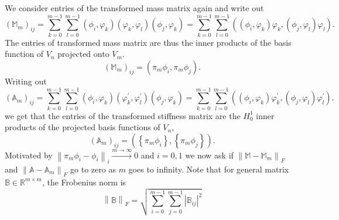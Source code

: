 \documentclass[a4paper,10pt]{article}
\newcommand{\R}{\ensuremath{\mathbb{R}}}
\newcommand{\norm}[1]{\ensuremath{\left\|#1\right\|}}
\newcommand{\inner}[2]{\ensuremath{\left(#1, #2\right)}}
\newcommand{\Amat}{\ensuremath{\mathbb{A}}}
\newcommand{\Bmat}{\ensuremath{\mathbb{B}}}
\newcommand{\Mmat}{\ensuremath{\mathbb{M}}}
\newcommand{\Ammat}{\ensuremath{\mathbb{A}_m}}               %
\newcommand{\Mmmat}{\ensuremath{\mathbb{M}_m}}               %
\begin{document}
  We consider entries of the transformed mass matrix again and write out
  \[
    \left(\Mmmat\right)_{ij} =
    \displaystyle\sum\limits_{k=0}^{m-1}
    \displaystyle\sum\limits_{l=0}^{m-1}
    \inner{\phi_i}{\varphi_k}\inner{\varphi_k}{\varphi_l}\inner{\phi_j}{\varphi_k}=
    \displaystyle\sum\limits_{k=0}^{m-1}
    \displaystyle\sum\limits_{l=0}^{m-1}
    \inner{\inner{\phi_i}{\varphi_k}\varphi_k}
          {\inner{\phi_j}{\varphi_l}\varphi_l}.
  \]
  The entries of transformed mass matrix are thus the inner products of the
  basis function of $V_n$ projected onto $V_m$.
  \[
    \left(\Mmmat\right)_{ij} = \inner{\pi_m\phi_i}
                                     {\pi_m\phi_j}.
  \]
  Writing out
  \[
    \left(\Ammat\right)_{ij} =
    \displaystyle\sum\limits_{k=0}^{m-1}
    \displaystyle\sum\limits_{l=0}^{m-1}
    \inner{\phi_i}{\varphi_k}
    \inner{\varphi_k^{\prime}}{\varphi_l^{\prime}}
    \inner{\phi_j}{\varphi_k}=
    \displaystyle\sum\limits_{k=0}^{m-1}
    \displaystyle\sum\limits_{l=0}^{m-1}
    \inner{\inner{\phi_i}{\varphi_k}\varphi_k^{\prime}}
    {\inner{\phi_j}{\varphi_l}\varphi_l^{\prime}}.
  \]
  we get that the entries of the transformed stiffness matrix are the $H^1_0$
  inner products of the projected basis functions of $V_n$,
  \[
    \left(\Ammat\right)_{ij} = \inner{\left\{\pi_m\phi_i\right\}}
    {\left\{\pi_m\phi_j\right\}}.
  \]
  Motivated by 
  $\norm{\pi_m \phi_i - \phi_i}_i \xrightarrow[]{m\rightarrow\infty}0$ and
  $i=0, 1$ we now ask if $\norm{\Mmat - \Mmmat}_{F}$ and 
  $\norm{\Amat - \Ammat}_{F}$ go to zero as $m$ goes to infinity. Note that
  for general matrix $\Bmat\in\R^{m\times m}$, the Frobenius norm is
  \[
    \norm{\Bmat}_{F} = \sqrt{
    \displaystyle\sum\limits_{i=0}^{m-1}
    \displaystyle\sum\limits_{j=0}^{m-1}
    \left|\Bmat_{ij}\right|^2
    }
  \]
\end{document}
